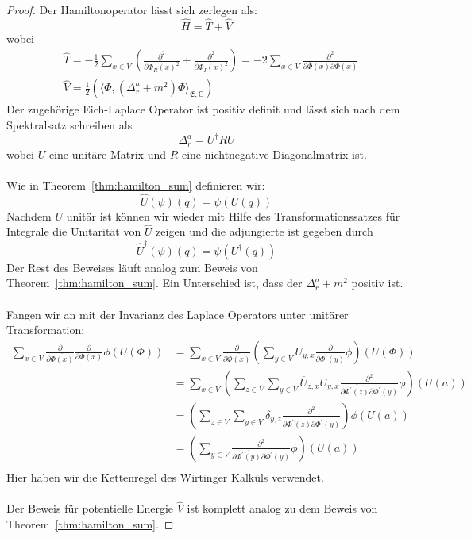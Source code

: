 \documentclass[11pt,a4paper,leqno]{report}
\numberwithin{equation}{chapter}
\begin{document}
\begin{proof} 
	Der Hamiltonoperator l\"asst sich zerlegen als:
\begin{equation*}
	\hat{H} = \hat{T} + \hat{V}
\end{equation*}
wobei
\begin{align*}
	&\hat{T} = -\frac{1}{2}\sum_{x\in V}(\frac{\partial^2}{\partial \Phi_{R}(x)^2}+\frac{\partial^2}{\partial \Phi_{I}(x)^2})= -2\sum_{x\in V}\frac{\partial^2}{\partial \overline{\Phi}(x)\partial \Phi(x)}\\
	&\hat{V} = \frac{1}{2}(\langle \Phi, (\Delta^{a}_r+ m^2)\Phi\rangle_{\mathfrak{E},\mathbb{C}})
\end{align*}
Der zugehörige Eich-Laplace Operator ist positiv definit und l\"asst sich nach dem Spektralsatz schreiben als
	\begin{equation*}
	\Delta^{a}_r = U^\dagger R U
\end{equation*}
wobei $U$ eine unit\"are Matrix und $R$ eine nichtnegative Diagonalmatrix ist.\\
\\
Wie in Theorem~\ref{thm:hamilton_sum} definieren wir: 
\begin{equation*}
	\hat{U}(\psi)(q)=\psi(U(q))
\end{equation*}
Nachdem \(U\) unitär ist können wir wieder mit Hilfe des Transformationssatzes für Integrale die Unitarität von $\hat{U}$ zeigen und die adjungierte ist gegeben durch 
\begin{equation*}
	\hat{U}^\dagger(\psi)(q)=\psi(U^\dagger(q))
\end{equation*}
Der Rest des Beweises läuft analog zum Beweis von Theorem~\ref{thm:hamilton_sum}. Ein Unterschied ist, dass der \(\Delta^{a}_r + m^2\) positiv ist.\\
\\
Fangen wir an mit der Invarianz des Laplace Operators unter unitärer Transformation:
	\begin{align*}
	\sum_{x\in V}\frac{\partial}{\partial \overline{\Phi(x)}}\frac{\partial}{\partial \Phi(x)}\phi(U(\Phi))&=
	\sum_{x\in V}\frac{\partial}{\partial \overline{\Phi(x)}}(\sum_{y\in V}U_{y,x}\frac{\partial}{\partial \Phi^{'}(y)}\phi)(U(\Phi))\\
	&=
	\sum_{x\in V}(\sum_{z\in V}\sum_{y\in V}\overline{U}_{z,x}U_{y,x}\frac{\partial^2}{\partial \overline{\Phi^{'}(z)}\partial \Phi^{'}(y)}\phi)(U(a))\\
	&=
	(\sum_{z\in V}\sum_{y\in V}\delta_{y,z}\frac{\partial^2}{\partial \overline{\Phi^{'}(z)}\partial \Phi^{'}(y)})\phi(U(a))\\
	&=
	(\sum_{y\in V}\frac{\partial^2}{\partial \overline{\Phi^{'}(y)}\partial \Phi^{'}(y)}\phi)(U(a))\\
\end{align*}
Hier haben wir die Kettenregel des Wirtinger Kalküls verwendet.\\
\\
Der Beweis für potentielle Energie $\hat{V}$ ist komplett analog zu dem Beweis von Theorem~\ref{thm:hamilton_sum}.
\end{proof}
\end{document}
